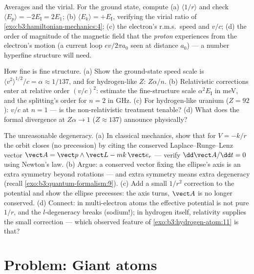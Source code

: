 \begin{exercise}[$\star\star\star$]\label{exo:b3:hydrogen-atom:10}
Averages and the virial. For the ground state, compute (a)
$\langle 1/r\rangle$ and check $\langle E_p\rangle = -2E_{\text{I}}
= 2E_1$; (b) $\langle E_k\rangle = +E_{\text{I}}$, verifying the
virial ratio of \cref{exo:b3:hamiltonian-mechanics:4}; (c) the
electron's r.m.s.\ speed and $v/c$; (d) the order of magnitude of the magnetic field that the
\emph{proton} experiences from the electron's motion (a current loop
$ev/2\pi a_0$ seen at distance $a_0$) --- a number hyperfine
structure will need.
\end{exercise}

\begin{exercise}[$\star\star\star$]\label{exo:b3:hydrogen-atom:11}
How fine is fine structure. (a) Show the ground-state speed scale
is $\langle v^2\rangle^{1/2}/c = \alpha \approx 1/137$, and for
hydrogen-like $Z$: $Z\alpha/n$. (b) Relativistic corrections enter
at relative order $(v/c)^2$: estimate the fine-structure scale
$\alpha^2E_{\text{I}}$ in meV, and the splitting's order for
$n = 2$ in GHz. (c) For hydrogen-like uranium ($Z = 92$): $v/c$ at
$n = 1$ --- is the non-relativistic treatment tenable? (d) What
does the formal divergence at $Z\alpha \to 1$ ($Z \approx 137$)
announce physically?
\end{exercise}

\begin{exercise}[$\star\star\star$]\label{exo:b3:hydrogen-atom:12}
The unreasonable degeneracy. (a) In classical mechanics, show that
for $V = -k/r$ the orbit closes (no precession) by citing the
conserved Laplace--Runge--Lenz vector $\vect A = \vect p\wedge\vect
L - mk\,\vect e_r$ --- verify $\dd\vect A/\dd t = 0$ using Newton's
law. (b) Argue: a conserved vector fixing the ellipse's axis is an
extra symmetry beyond rotations --- and extra symmetry means extra
degeneracy (recall \cref{exo:b3:quantum-formalism:9}). (c) Add a
small $1/r^2$ correction to the potential and show the ellipse
precesses: the axis turns, $\vect A$ is no longer conserved. (d)
Connect: in multi-electron atoms the effective potential is not
pure $1/r$, and the $l$-degeneracy breaks (sodium!); in hydrogen
itself, relativity supplies the small correction --- which
observed feature of \cref{exo:b3:hydrogen-atom:11} is that?
\end{exercise}

\section{Problem: Giant atoms}

